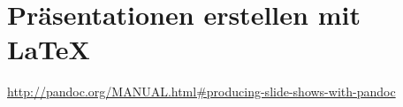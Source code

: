 \chapter{Präsentationen erstellen mit \LaTeX}

\url{http://pandoc.org/MANUAL.html#producing-slide-shows-with-pandoc}